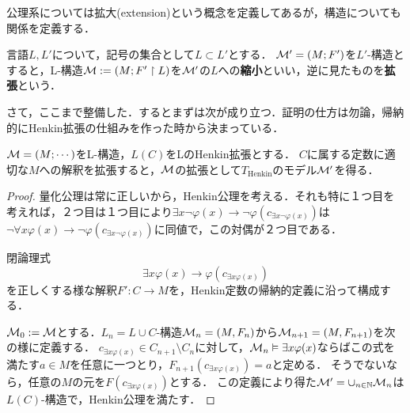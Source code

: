 \documentclass[uplatex, 12pt, dvipdfmx]{jsreport}
\begin{document}
公理系については拡大(extension)という概念を定義してあるが，構造についても関係を定義する．
\begin{definition}
    言語$L,L'$について，記号の集合として$L\subset L'$とする．
    $\mathcal{M}'=(M;F')$を$L'$-構造とすると，L-構造$\mathcal{M}:=(M;F'\restriction L)$を$\mathcal{M}'$の$L$への\textbf{縮小}といい，逆に見たものを\textbf{拡張}という．
\end{definition}

さて，ここまで整備した．するとまずは次が成り立つ．証明の仕方は勿論，帰納的にHenkin拡張の仕組みを作った時から決まっている．
\begin{lemma}
    $\mathcal{M}=(M;\cdots)$をL-構造，$L(C)$をLのHenkin拡張とする．
    $C$に属する定数に適切な$M$への解釈を拡張すると，$\mathcal{M}$の拡張として$T_\mathrm{Henkin}$のモデル$\mathcal{M}'$を得る．
\end{lemma}
\begin{proof}
    量化公理は常に正しいから，Henkin公理を考える．それも特に１つ目を考えれば，２つ目は１つ目により$\exists x\lnot\varphi(x)\to\lnot\varphi(c_{\exists x\lnot\varphi(x)})$は
    $\lnot\forall x\varphi(x)\to\lnot\varphi(c_{\exists x\lnot\varphi(x)})$に同値で，この対偶が２つ目である．

    閉論理式\[ \exists x\varphi(x) \to \varphi(c_{\exists x\varphi(x)}) \]
    を正しくする様な解釈$F':C\to M$を，Henkin定数の帰納的定義に沿って構成する．
    
    $\mathcal{M}_0:=\mathcal{M}$とする．$L_n=L\cup C$-構造$\mathcal{M}_n=(M,F_n)$から$\mathcal{M}_{n+1}=(M,F_{n+1})$を次の様に定義する．
    $c_{\exists x\varphi(x)}\in C_{n+1}\setminus C_n$に対して，$\mathcal{M}_n\vDash \exists x\varphi(x)$ならばこの式を満たす$a\in M$を任意に一つとり，$F_{n+1}(c_{\exists x\varphi(x)})=a$と定める．
    そうでないなら，任意の$M$の元を$F(c_{\exists x\varphi(x)})$とする．
    この定義により得た$\mathcal{M}'=\cup_{n\in\mathbb{N}}\mathcal{M}_n$は$L(C)$-構造で，Henkin公理を満たす．
\end{proof}
\end{document}
